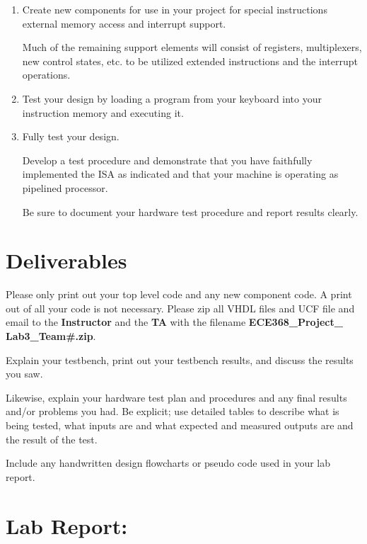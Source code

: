 \documentclass{article}
\begin{document}
\begin{enumerate}
\item Create new components for use in your project for special instructions external memory access and interrupt support.

Much of the remaining support elements will consist of registers, multiplexers, new control states, etc. to be utilized extended instructions and the interrupt operations.

\item Test your design by loading a program from your keyboard into your instruction memory and executing it.

\item Fully test your design. 

Develop a test procedure and demonstrate that you have faithfully implemented the ISA as indicated and that your machine is operating as pipelined processor.

Be sure to document your hardware test procedure and report results clearly.

\end{enumerate}

\section{Deliverables}

Please only print out your top level code and any new component code. A print out of all your code is not necessary. Please zip all VHDL files and UCF file and email to the \textbf{Instructor} and the \textbf{TA} with the filename \textbf{ECE368\_Project\_ Lab3\_Team\#.zip}.

Explain your testbench, print out your testbench results, and discuss the results you saw.

Likewise, explain your hardware test plan and procedures and any final results and/or problems you had. Be explicit; use detailed tables to describe what is being tested, what inputs are and what expected and measured outputs are and the result of the test.

Include any handwritten design flowcharts or pseudo code used in your lab report.

\section{Lab Report:}
\end{document}
